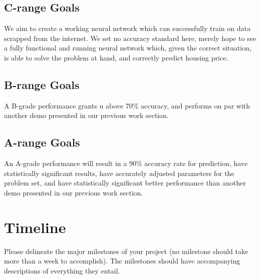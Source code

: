 \documentclass[]{article}
\begin{document}
\subsection{C-range Goals}

We aim to create a working neural network which can successfully train on data scrapped from the internet.  We set no accuracy standard here, merely hope to see a fully functional and running neural network which, given the correct situation, is able to solve the problem at hand, and correctly predict housing price.

\subsection{B-range Goals}

A B-grade performance grants u above 70\% accuracy, and performs on par with another demo presented in our previous work section.

\subsection{A-range Goals}

An A-grade performance will result in a 90\% accuracy rate for prediction, have statistically significant results, have accurately adjusted parameters for the problem set, and have statistically significant better performance than another demo presented in our previous work section. 


\section*{Timeline}
Please delineate the major milestones of your project (no milestone should take more than a week to accomplish). The milestones should have accompanying descriptions of everything they entail.\\
\end{document}
